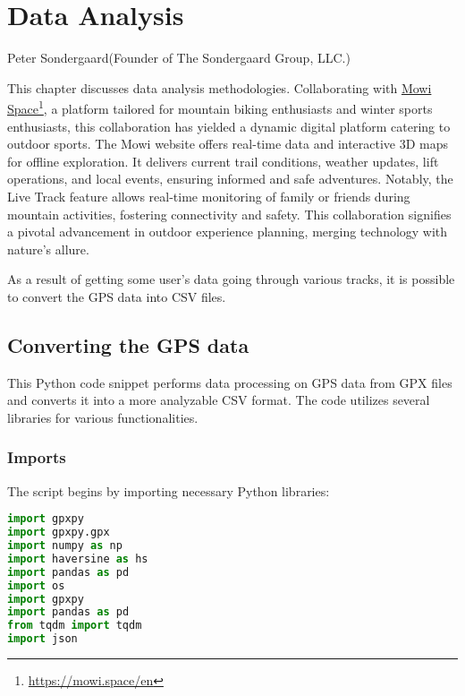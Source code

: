 %
\chapter{Data Analysis}
\label{sec:data}

{Peter Sondergaard}{(Founder of The Sondergaard Group, LLC.)}


This chapter discusses data analysis methodologies. Collaborating with \href{https://mowi.space/en}{Mowi Space}\footnote{\url{https://mowi.space/en}}, a platform tailored for mountain biking enthusiasts and winter sports enthusiasts, this collaboration has yielded a dynamic digital platform catering to outdoor sports. The Mowi website offers real-time data and interactive 3D maps for offline exploration. It delivers current trail conditions, weather updates, lift operations, and local events, ensuring informed and safe adventures. Notably, the Live Track feature allows real-time monitoring of family or friends during mountain activities, fostering connectivity and safety. This collaboration signifies a pivotal advancement in outdoor experience planning, merging technology with nature's allure.

As a result of getting some user's data going through various tracks,
it is possible to convert the GPS data into CSV files.


\section{Converting the GPS data}
\label{sec:data-gps}

This Python code snippet performs data processing on GPS data from GPX files and converts it into 
a more analyzable CSV format. The code utilizes several libraries for various functionalities.

\subsection{Imports}

The script begins by importing necessary Python libraries:

\begin{lstlisting}[language=Python]
import gpxpy
import gpxpy.gpx
import numpy as np
import haversine as hs
import pandas as pd
import os
import gpxpy
import pandas as pd
from tqdm import tqdm
import json
\end{lstlisting}

